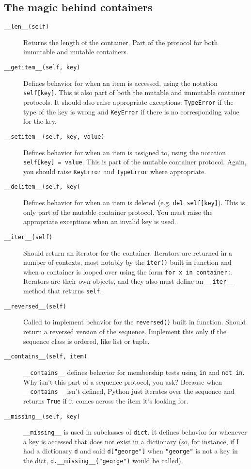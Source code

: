 \documentclass[a4paper,11pt]{article}
\newcommand{\code}[1]{\texttt{#1}}
\begin{document}
\subsection{The magic behind containers}
\begin{description}

\item[\code{__len__(self)}]
Returns the length of the container. Part of the protocol for both immutable and mutable containers.
\item[\code{__getitem__(self, key)}]
Defines behavior for when an item is accessed, using the notation \code{self[key]}. This is also part of both the mutable and immutable container protocols. It should also raise appropriate exceptions: \code{TypeError} if the type of the key is wrong and \code{KeyError} if there is no corresponding value for the key.
\item[\code{__setitem__(self, key, value)}]
Defines behavior for when an item is assigned to, using the notation \code{self[key] = value}. This is part of the mutable container protocol. Again, you should raise \code{KeyError} and \code{TypeError} where appropriate.
\item[\code{__delitem__(self, key)}]
Defines behavior for when an item is deleted (e.g. \code{del self[key]}). This is only part of the mutable container protocol. You must raise the appropriate exceptions when an invalid key is used.
\item[\code{__iter__(self)}]
Should return an iterator for the container. Iterators are returned in a number of contexts, most notably by the \code{iter()} built in function and when a container is looped over using the form \code{for x in container:}. Iterators are their own objects, and they also must define an \code{__iter__} method that returns \code{self}.
\item[\code{__reversed__(self)}]
Called to implement behavior for the \code{reversed()} built in function. Should return a reversed version of the sequence. Implement this only if the sequence class is ordered, like list or tuple.
\item[\code{__contains__(self, item)}]
\code{__contains__} defines behavior for membership tests using \code{in} and \code{not in}. Why isn't this part of a sequence protocol, you ask? Because when \code{__contains__} isn't defined, Python just iterates over the sequence and returns \code{True} if it comes across the item it's looking for.
\item[\code{__missing__(self, key)}]
\code{__missing__} is used in subclasses of \code{dict}. It defines behavior for whenever a key is accessed that does not exist in a dictionary (so, for instance, if I had a dictionary \code{d} and said \code{d["george"]} when \code{"george"} is not a key in the dict, \code{d.__missing__("george")} would be called).

\end{description}
\end{document}
